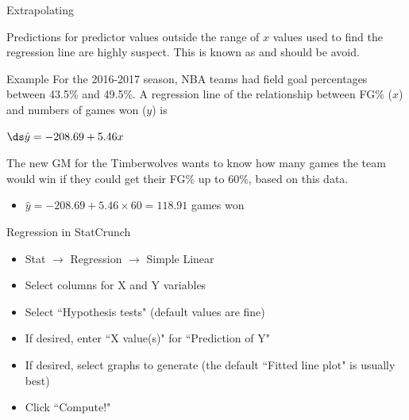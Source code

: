 \documentclass[xcolor=table]{beamer}
\begin{document}
\begin{frame}{Extrapolating}
\begin{block}{}
\large
Predictions for predictor values outside the range of $x$ values used to find the regression line are highly suspect. This is known as  and should be avoid.
\end{block}

\pause
\begin{exampleblock}{Example}
For the 2016-2017 season, NBA teams had field goal percentages between 43.5\% and 49.5\%. A regression line of the relationship between FG\% ($x$) and numbers of games won ($y$) is  \\
\smallskip
{\centering
$\ds \hat y = -208.69 + 5.46 x$
\par}
\smallskip
The new GM for the Timberwolves wants to know how many games the team would win if they could get their FG\% up to 60\%, based on this data.
\begin{itemize}
\pause\item $\hat y = -208.69 + 5.46 \times 60 = 118.91$ games won
\end{itemize}

\end{exampleblock}

\end{frame}

\begin{frame}{Regression in StatCrunch}
\begin{block}{}
\begin{itemize}
\item Stat $\to$ Regression $\to$ Simple Linear
\item Select columns for X and Y variables
\item Select ``Hypothesis tests" (default values are fine)
\item If desired, enter ``X value(s)" for ``Prediction of Y"
\item If desired, select graphs to generate (the default ``Fitted line plot" is usually best)
\item Click ``Compute!"
\end{itemize}
\end{block}
\end{frame}
\end{document}
